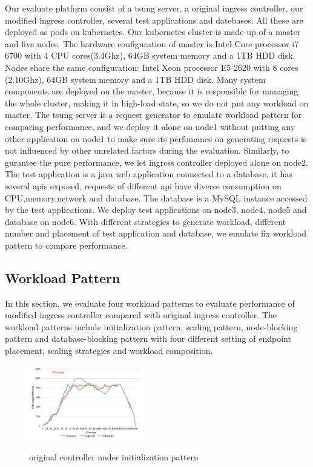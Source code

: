 Our evaluate platform consist of a tsung server, a original ingress controller, our modified ingress controller, several test applications and datebases.
All these are deployed as pods on kubernetes. Our kubernetes cluster is made up of a master and five nodes. The hardware configuration of master is Intel Core processor i7 6700 with 4 CPU cores(3.4Ghz), 64GB system memory and
a 1TB HDD disk. Nodes share the same configuration: Intel Xeon processor E5 2620 with 8 cores (2.10Ghz), 64GB system memory and a 1TB HDD disk. Many system components are deployed on the master, because it is responsible for managing the whole cluster, making it in high-load state, so we do not put any workload on master.
The tsung server is a request generator to emulate workload pattern for comparing performance, and we deploy it alone on node1 without putting any other application on node1 to make sure its perfomance on generating requests is not influenced by other unrelated factors during the evaluation.
Similarly, to gurantee the pure performance, we let ingress controller deployed alone on node2. The test application is a java web application connected to a database, it has several apis exposed, requests of different api have diverse consumption on CPU,memory,network and database.
The database is a MySQL instance accessed by the test applications. We deploy test applications on node3, node4, node5 and database on node6. With different strategies to generate workload, different number and placement of test application and database, we emulate fix workload pattern to
compare performance.

\subsection{Workload Pattern}
\label{subsec:workload_pattern}
In this section, we evaluate four workload patterns to evaluate performance of modified ingress controller compared with original ingress controller.
The workload patterns include initialization pattern, scaling pattern, node-blocking pattern and database-blocking pattern with four different setting of
endpoint placement, scaling strategies and workload composition.
\begin{figure}[!htb]
 \centering
 \includegraphics[width=0.45\textwidth]{images/data1.png}\\
 \caption{original controller under initialization pattern}
 \label{fig:original_initialization}
\end{figure}


